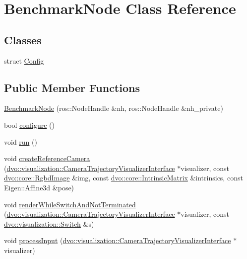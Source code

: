 \hypertarget{class_benchmark_node}{}\section{Benchmark\+Node Class Reference}
\label{class_benchmark_node}
\subsection*{Classes}
\begin{DoxyCompactItemize}
\item 
struct \mbox{\hyperlink{struct_benchmark_node_1_1_config}{Config}}
\end{DoxyCompactItemize}
\subsection*{Public Member Functions}
\begin{DoxyCompactItemize}
\item 
\mbox{\hyperlink{class_benchmark_node_ad4ee7b497428bce6426add3c4010200e}{Benchmark\+Node}} (ros\+::\+Node\+Handle \&nh, ros\+::\+Node\+Handle \&nh\+\_\+private)
\item 
bool \mbox{\hyperlink{class_benchmark_node_a6fb208304f873fb46988f6ca4ed0b9d8}{configure}} ()
\item 
void \mbox{\hyperlink{class_benchmark_node_a4f509351e1c61f174f64146fe3abb463}{run}} ()
\item 
void \mbox{\hyperlink{class_benchmark_node_ac906f068111a96dc95b289d3728df574}{create\+Reference\+Camera}} (\mbox{\hyperlink{classdvo_1_1visualization_1_1_camera_trajectory_visualizer_interface}{dvo\+::visualization\+::\+Camera\+Trajectory\+Visualizer\+Interface}} $\ast$visualizer, const \mbox{\hyperlink{structdvo_1_1core_1_1_rgbd_image}{dvo\+::core\+::\+Rgbd\+Image}} \&img, const \mbox{\hyperlink{structdvo_1_1core_1_1_intrinsic_matrix}{dvo\+::core\+::\+Intrinsic\+Matrix}} \&intrinsics, const Eigen\+::\+Affine3d \&pose)
\item 
void \mbox{\hyperlink{class_benchmark_node_aa8ac48849e2165f15af69e561ecb97e6}{render\+While\+Switch\+And\+Not\+Terminated}} (\mbox{\hyperlink{classdvo_1_1visualization_1_1_camera_trajectory_visualizer_interface}{dvo\+::visualization\+::\+Camera\+Trajectory\+Visualizer\+Interface}} $\ast$visualizer, const \mbox{\hyperlink{structdvo_1_1visualization_1_1_switch}{dvo\+::visualization\+::\+Switch}} \&s)
\item 
void \mbox{\hyperlink{class_benchmark_node_a81ccf22ce05702c97803a502092090f7}{process\+Input}} (\mbox{\hyperlink{classdvo_1_1visualization_1_1_camera_trajectory_visualizer_interface}{dvo\+::visualization\+::\+Camera\+Trajectory\+Visualizer\+Interface}} $\ast$visualizer)
\end{DoxyCompactItemize}


